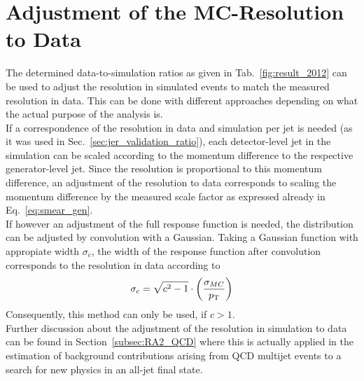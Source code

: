 \section{Adjustment of the MC-Resolution to Data}
\label{sec:jer_adjustment}
The determined data-to-simulation ratios as given in Tab.~\ref{fig:result_2012} can be used to adjust the resolution in simulated events to match the measured resolution in data. This can be done with different approaches depending on what the actual purpose of the analysis is. \\
If a correspondence of the resolution in data and simulation per jet is needed (as it was used in Sec.~\ref{sec:jer_validation_ratio}), each detector-level jet in the simulation can be scaled according to the momentum difference to the respective generator-level jet. Since the resolution is proportional to this momentum difference, an adjustment of the resolution to data corresponds to scaling the momentum difference by the measured scale factor as expressed already in Eq.~\ref{eq:smear_gen}. \\
If however an adjustment of the full response function is needed, the distribution can be adjusted by convolution with a Gaussian. Taking a Gaussian function with appropiate width $\sigma_{c}$, the width of the response function after convolution corresponds to the resolution in data according to 
\begin{equation}
\sigma_{c} = \sqrt{c^2-1} \cdot \left( \frac{\sigma_{MC}}{p_{\text{T}}} \right)
\label{eq:res_adjust}
\end{equation}
Consequently, this method can only be used, if $c > 1$. \\
Further discussion about the adjustment of the resolution in simulation to data can be found in Section~\ref{subsec:RA2_QCD} where this is actually applied in the estimation of background contributions arising from QCD multijet events to a search for new physics in an all-jet final state.  













